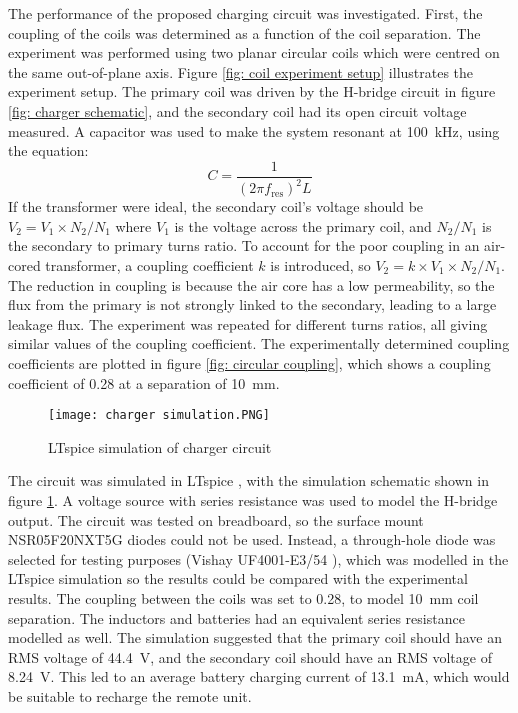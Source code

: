 The performance of the proposed charging circuit was investigated. First, the coupling of the coils was determined as a function of the coil separation. The experiment was performed using two planar circular coils which were centred on the same out-of-plane axis. Figure \ref{fig: coil experiment setup} illustrates the experiment setup. The primary coil was driven by the H-bridge circuit in figure \ref{fig: charger schematic}, and the secondary coil had its open circuit voltage measured. A capacitor was used to make the system resonant at \SI{100}{\kilo\hertz}, using the equation:
\begin{equation}
C = \frac{1}{(2\pi f_\text{res})^2L}
\end{equation}
If the transformer were ideal, the secondary coil's voltage should be $V_2 = V_1 \times N_2 / N_1$ where $V_1$ is the voltage across the primary coil, and $N_2 / N_1$ is the secondary to primary turns ratio. To account for the poor coupling in an air-cored transformer, a coupling coefficient $k$ is introduced, so $V_2 = k \times V_1 \times N_2 / N_1$. The reduction in coupling is because the air core has a low permeability, so the flux from the primary is not strongly linked to the secondary, leading to a large leakage flux. The experiment was repeated for different turns ratios, all giving similar values of the coupling coefficient. The experimentally determined coupling coefficients are plotted in figure \ref{fig: circular coupling}, which shows a coupling coefficient of 0.28 at a separation of \SI{10}{\milli\metre}.\\


\begin{figure}[htb]
	\centering
	\texttt{[image: charger simulation.PNG]}
	\caption{LTspice simulation of charger circuit}
	\label{fig: charger simulation}
\end{figure}

The circuit was simulated in LTspice \cite{ltspice}, with the simulation schematic shown in figure \ref{fig: charger simulation}. A voltage source with series resistance was used to model the H-bridge output. The circuit was tested on breadboard, so the surface mount NSR05F20NXT5G diodes could not be used. Instead, a through-hole diode was selected for testing purposes (Vishay UF4001-E3/54 \cite{tht_diode}), which was modelled in the LTspice simulation so the results could be compared with the experimental results. The coupling between the coils was set to 0.28, to model \SI{10}{\milli\metre} coil separation. The inductors and batteries had an equivalent series resistance modelled as well. The simulation suggested that the primary coil should have an RMS voltage of \SI{44.4}{\volt}, and the secondary coil should have an RMS voltage of \SI{8.24}{\volt}. This led to an average battery charging current of \SI{13.1}{\milli\ampere}, which would be suitable to recharge the remote unit. \\

